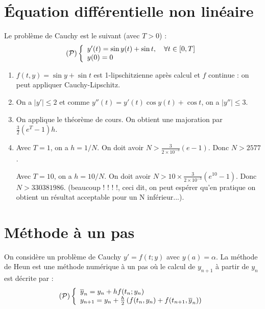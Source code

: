\documentclass[a4paper]{article}
\begin{document}

\section{Équation différentielle non linéaire}
 Le problème de Cauchy est le suivant (avec $T > 0$) :
\[({\cal P})\left\{\begin{array}{l}
y'(t)= \sin y(t) + \sin t,\quad \forall t\in[0,T]\\
y(0)=0
\end{array}\right.\]
\begin{enumerate}
\item  $f(t, y) = \sin y + \sin t$ est 1-lipschitzienne après calcul et $f$ continue : on peut
appliquer Cauchy-Lipschitz.
\item  On a $|y'|\leq 2$ et comme $y''(t) = y'(t) \cos y(t) + \cos t$, on a $|y''|\leq 3$.
\item  On applique le théorème de cours. On obtient une majoration par $\frac 32(e^T-1)h$.
\item  Avec $T = 1$, on a $h = 1/N$. On doit avoir $N >\frac 3{2\times 10^{-3}}(e-1)$. Donc $N > 2577$.

Avec $T = 10$, on a $h = 10/N$. On doit avoir $N > 10 \times \frac 3{2\times 10^{-3}}(e^{10}-1)$. Donc $N >330381986$. (beaucoup ! ! ! !, ceci dit, on peut espérer qu'en pratique on obtient un résultat
acceptable pour un N inférieur...).
\end{enumerate}



\section{Méthode à un pas}
 On considère un problème de Cauchy $y' = f(t; y)$ avec $y(a) = \alpha$.
La méthode de Heun est une méthode numérique à un pas où le calcul de $y_{n+1}$ à partir de $y_n$ est décrite par :
\[({\cal P})\left\{\begin{array}{l}
\overline{y}_n= y_n + hf(t_n; y_n)\\
y_{n+1} = y_n +\frac h2\left(f(t_n,y_n) + f(t_{n+1},\overline{y}_n)\right)
\end{array}\right.\]
\end{document}
